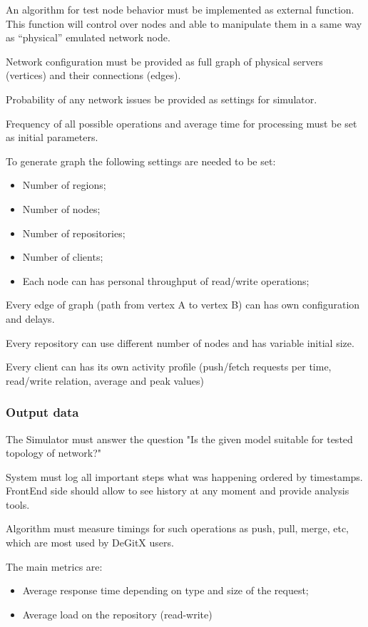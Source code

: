 \documentclass[12pt,oneside]{article}
\begin{document}
An algorithm for test node behavior must be implemented as external function. This function will control over nodes and able to manipulate them in a same way as ``physical'' emulated network node.

Network configuration must be provided as full graph of physical servers (vertices) and their connections (edges).

Probability of any network issues be provided as settings for simulator.

Frequency of all possible operations and average time for processing must be set as initial parameters.

To generate graph the following settings are needed to be set:
\begin{itemize}
    \item Number of regions;
    \item Number of nodes;
    \item Number of repositories;
    \item Number of clients;
    \item Each node can has personal throughput of read/write operations;
\end{itemize}

Every edge of graph (path from vertex A to vertex B) can has own configuration and delays.

Every repository can use different number of nodes and has variable initial size.

Every client can has its own activity profile (push/fetch requests per time, read/write relation, average and peak values)

\subsubsection{Output data}
\label{sec:output}

The Simulator must answer the question "Is the given model suitable for tested topology of network?"

System must log all important steps what was happening ordered by timestamps. FrontEnd side should allow to see history at any moment and provide analysis tools.

Algorithm must measure timings for such operations as push,  pull, merge, etc, which are most used by DeGitX users.

The main metrics are:
\begin{itemize}
    \item Average response time depending on type and size of the request;
    \item Average load on the repository (read-write)
\end{itemize}
\end{document}
